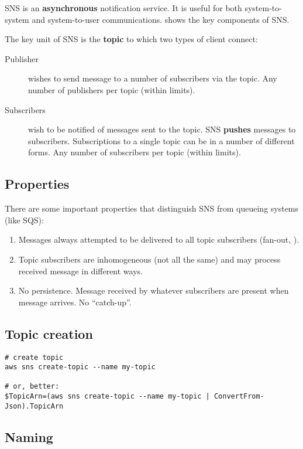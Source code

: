 \documentclass{pgnotes}
\begin{document}
SNS is an \textbf{asynchronous} notification service. It is useful for
both system-to-system and system-to-user communications. shows the key
components of SNS.

The key unit of SNS is the \textbf{topic} to which two types of client
connect:

\begin{description}
\item[Publisher]
wishes to send message to a number of subscribers via the topic. Any
number of publishers per topic (within limits).
\item[Subscribers]
wish to be notified of messages sent to the topic. SNS \textbf{pushes}
messages to subscribers. Subscriptions to a single topic can be in a
number of different forms. Any number of subscribers per topic (within
limits).
\end{description}

\subsection{Properties}\label{properties}

There are some important properties that distinguish SNS from queueing
systems (like SQS):

\begin{enumerate}
\def\labelenumi{\arabic{enumi}.}
\item
  Messages always attempted to be delivered to all topic subscribers
  (fan-out, ).
\item
  Topic subscribers are inhomogeneous (not all the same) and may process
  received message in different ways.
\item
  No persistence. Message received by whatever subscribers are present
  when message arrives. No ``catch-up''.
\end{enumerate}

\subsection{Topic creation}\label{topic-creation}

\begin{verbatim}
# create topic
aws sns create-topic --name my-topic

# or, better:
$TopicArn=(aws sns create-topic --name my-topic | ConvertFrom-Json).TopicArn
\end{verbatim}

\subsection{Naming}\label{naming}
\end{document}
